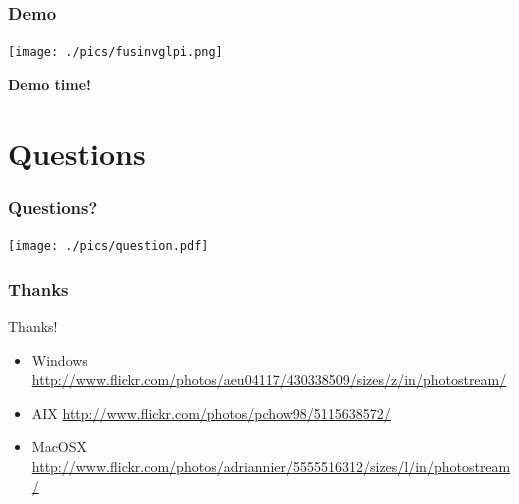 \documentclass{beamer}
\begin{document}

\begin{frame}
    \frametitle{Demo}

   \texttt{[image: ./pics/fusinvglpi.png]}

    \bf{Demo time!}
\end{frame}


\section{Questions}

\begin{frame}
    \frametitle{Questions?}

    \begin{center}

    \texttt{[image: ./pics/question.pdf]}

    \end{center}

\end{frame}



\begin{frame}
    \frametitle{Thanks}

    \begin{block}{Thanks!}
        \begin{itemize}
            \item Windows \url{http://www.flickr.com/photos/aeu04117/430338509/sizes/z/in/photostream/}
            \item AIX \url{http://www.flickr.com/photos/pchow98/5115638572/}
            \item MacOSX \url{http://www.flickr.com/photos/adriannier/5555516312/sizes/l/in/photostream/}
        \end{itemize}
    \end{block}
\end{frame}
\end{document}
